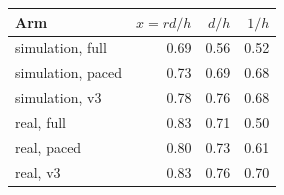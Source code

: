\begin{tabular}{@{}l r r r@{}}
\toprule
Arm & $x=rd/h$ & $d/h$ & $1/h$ \\
\midrule
simulation, full & 0.69 & 0.56 & 0.52 \\
simulation, paced & 0.73 & 0.69 & 0.68 \\
simulation, v3 & 0.78 & 0.76 & 0.68 \\
real, full & 0.83 & 0.71 & 0.50 \\
real, paced & 0.80 & 0.73 & 0.61 \\
real, v3 & 0.83 & 0.76 & 0.70 \\
\bottomrule
\end{tabular}
